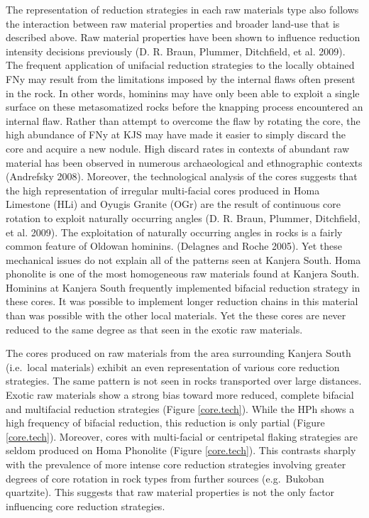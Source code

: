 \documentclass[]{elsarticle} %
\begin{document}
The representation of reduction strategies in each raw materials type
also follows the interaction between raw material properties and broader
land-use that is described above. Raw material properties have been
shown to influence reduction intensity decisions previously (D. R.
Braun, Plummer, Ditchfield, et al. 2009). The frequent application of
unifacial reduction strategies to the locally obtained FNy may result
from the limitations imposed by the internal flaws often present in the
rock. In other words, hominins may have only been able to exploit a
single surface on these metasomatized rocks before the knapping process
encountered an internal flaw. Rather than attempt to overcome the flaw
by rotating the core, the high abundance of FNy at KJS may have made it
easier to simply discard the core and acquire a new nodule. High discard
rates in contexts of abundant raw material has been observed in numerous
archaeological and ethnographic contexts (Andrefsky 2008). Moreover, the
technological analysis of the cores suggests that the high
representation of irregular multi-facial cores produced in Homa
Limestone (HLi) and Oyugis Granite (OGr) are the result of continuous
core rotation to exploit naturally occurring angles (D. R. Braun,
Plummer, Ditchfield, et al. 2009). The exploitation of naturally
occurring angles in rocks is a fairly common feature of Oldowan
hominins. (Delagnes and Roche 2005). Yet these mechanical issues do not
explain all of the patterns seen at Kanjera South. Homa phonolite is one
of the most homogeneous raw materials found at Kanjera South. Hominins
at Kanjera South frequently implemented bifacial reduction strategy in
these cores. It was possible to implement longer reduction chains in
this material than was possible with the other local materials. Yet the
these cores are never reduced to the same degree as that seen in the
exotic raw materials.

The cores produced on raw materials from the area surrounding Kanjera
South (i.e.~local materials) exhibit an even representation of various
core reduction strategies. The same pattern is not seen in rocks
transported over large distances. Exotic raw materials show a strong
bias toward more reduced, complete bifacial and multifacial reduction
strategies (Figure \ref{core.tech}). While the HPh shows a high
frequency of bifacial reduction, this reduction is only partial (Figure
\ref{core.tech}). Moreover, cores with multi-facial or centripetal
flaking strategies are seldom produced on Homa Phonolite (Figure
\ref{core.tech}). This contrasts sharply with the prevalence of more
intense core reduction strategies involving greater degrees of core
rotation in rock types from further sources (e.g.~Bukoban quartzite).
This suggests that raw material properties is not the only factor
influencing core reduction strategies.
\end{document}
